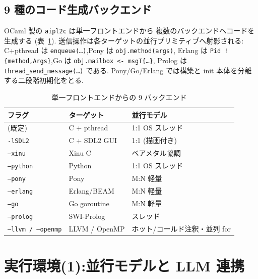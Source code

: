 \documentclass[11pt,a4paper]{article}
\newcommand{\code}[1]{\texttt{\small #1}}
\begin{document}
\subsection{9 種のコード生成バックエンド}\label{sec:backends}
OCaml 製の \code{aipl2c} は単一フロントエンドから
複数のバックエンドへコードを生成する (表~\ref{tab:backends}).
送信操作は各ターゲットの並行プリミティブへ射影される:
C+pthread は \code{enqueue(\dots)},Pony は \code{obj.method(args)},
Erlang は \code{Pid ! \{method,Args\}},Go は \code{obj.mailbox <- msgT\{\dots\}},
Prolog は \code{thread\_send\_message(\dots)} である.
Pony/Go/Erlang では構築と init 本体を分離する二段階初期化をとる.

\begin{table}[h]
\centering\small
\caption{単一フロントエンドからの 9 バックエンド}\label{tab:backends}
\begin{tabularx}{\linewidth}{@{}l l X@{}}
\toprule
フラグ & ターゲット & 並行モデル \\
\midrule
(既定) & C + pthread & 1:1 OS スレッド \\
\code{-lSDL2} & C + SDL2 GUI & 1:1 (描画付き) \\
\code{--xinu} & Xinu C & ベアメタル協調 \\
\code{--python} & Python & 1:1 OS スレッド \\
\code{--pony} & Pony & M:N 軽量 \\
\code{--erlang} & Erlang/BEAM & M:N 軽量 \\
\code{--go} & Go goroutine & M:N 軽量 \\
\code{--prolog} & SWI-Prolog & スレッド \\
\code{--llvm / --openmp} & LLVM / OpenMP & ホット/コールド注釈・並列 for \\
\bottomrule
\end{tabularx}
\end{table}

\section{実行環境(1):並行モデルと LLM 連携}\label{sec:runtime}
\end{document}
